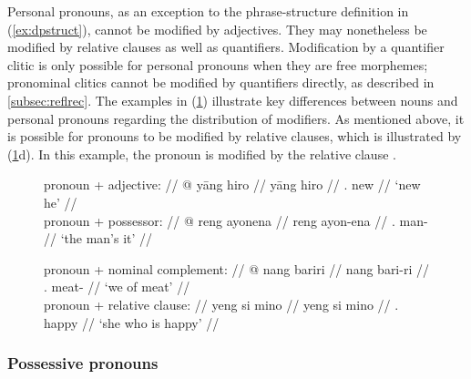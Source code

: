 Personal pronouns, as an exception to the phrase-structure definition in
(\ref{ex:dpstruct}), cannot be modified by adjectives. They may nonetheless be
modified by relative clauses as well as quantifiers. Modification by a
quantifier clitic is only possible for personal pronouns when they are free
morphemes; pronominal clitics cannot be modified by quantifiers directly, as
described in \autoref{subsec:reflrec}. The examples in (\ref{ex:nonounmods})
illustrate key differences between nouns and personal pronouns regarding the
distribution of modifiers. As mentioned above, it is possible for pronouns to
be modified by relative clauses, which is illustrated by
(\ref{ex:nonounmods}d). In this example, the pronoun  is
modified by the relative clause .

\begin{figure}
\ex{}\label{ex:nonounmods}
\begin{minipage}[t]{.5\remaining}
\tl\quad%
	\begingl
		\glpreamble pronoun + adjective: //
		\gla * @ yāng hiro //
		\glb {} yāng hiro //
		\glc {} \TsgM{}.\Aarg{} new //
		\glft \hphantom{*}`new he' //
	\endgl\smallskip\\

\tl\quad%
	\begingl
		\glpreamble pronoun + possessor: //
		\gla * @ reng ayonena //
		\glb {} reng ayon-ena //
		\glc {} \TsgI{}.\Aarg{} man-\Gen{} //
		\glft \hphantom{*}`the man's it' //
	\endgl
\end{minipage}
\begin{minipage}[t]{.5\remaining}
\tl\quad%
	\begingl
		\glpreamble pronoun + nominal complement: //
		\gla * @ nang bariri //
		\glb {} nang bari-ri //
		\glc {} \Fpl{}.\Aarg{} meat-\Ins{} //
		\glft \hphantom{*}`we of meat' //
	\endgl\smallskip\\

\tl\quad%
	\begingl
		\glpreamble pronoun + relative clause: //
		\gla yeng si mino //
		\glb yeng si mino //
		\glc \TsgF{}.\Aarg{} \Rel{} happy //
		\glft `she who is happy' //
	\endgl
\end{minipage}
\xe
\end{figure}


\subsubsection{Possessive pronouns}
\label{ex:subsubsec:possprosyn}

